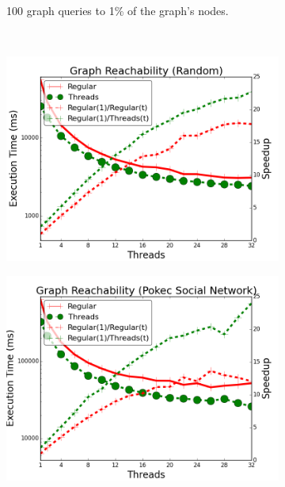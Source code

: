 \begin{figure}[]
\begin{subfigure}[b]{\plotsize\textwidth}
{           100 graph queries to 1\% of the graph's nodes.}
           \label{fig:threads:search_twitter}
        \end{subfigure} \\
        \begin{subfigure}[b]{\plotsize\textwidth}
           \includegraphics[width=\textwidth]{experiments/threads/cmp-search-random.png}
           \label{fig:threads:search_random}
        \end{subfigure}
        \spacing
        \begin{subfigure}[b]{\plotsize\textwidth}
           \includegraphics[width=\textwidth]{experiments/threads/cmp-search-pokec.png}
           \label{fig:threads:search_pokec}
        \end{subfigure} \\
        \label{fig:threads:results_search}
\end{figure}

